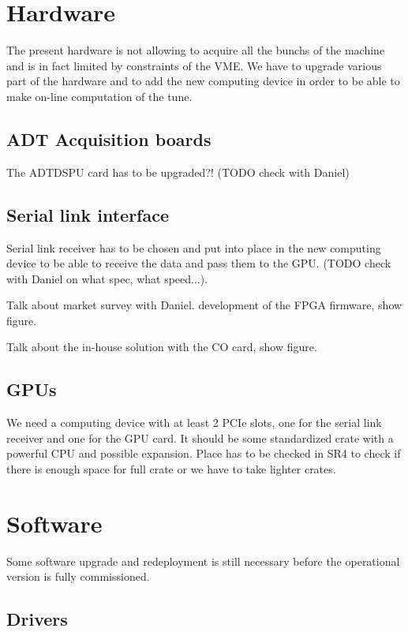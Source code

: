 \section{Hardware}

The present hardware is not allowing to acquire all the \glspl{bunch} of the machine and is in fact limited by constraints of the \gls{VME}. We have to upgrade various part of the hardware and to add the new computing device in order to be able to make on-line computation of the tune.

	\subsection{ADT Acquisition boards}

	The ADTDSPU card has to be upgraded?! (TODO check with Daniel)

	\subsection{Serial link interface}

	Serial link receiver has to be chosen and put into place in the new computing device to be able to receive the data and pass them to the \gls{GPU}. (TODO check with Daniel on what spec, what speed...).

	Talk about market survey with Daniel. development of the FPGA firmware, show figure.

	Talk about the in-house solution with the CO card, show figure.

	\subsection{GPUs}

	We need a computing device with at least 2 PCIe slots, one for the serial link receiver and one for the \gls{GPU} card. It should be some standardized crate with a powerful \gls{CPU} and possible expansion. Place has to be checked in SR4 to check if there is enough space for full crate or we have to take lighter crates.

\section{Software}

Some software upgrade and redeployment is still necessary before the operational version is fully commissioned.

	\subsection{Drivers}

